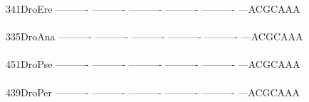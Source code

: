 \documentclass[11pt,twoside,reqno,a4paper]{article}
\begin{document}
{341\hspace*{1\charwidth}DroEre	----------	----------	----------	----------	----------	---ACGCAAA	\\
\hspace*{4\charwidth}\hspace*{7\charwidth}\hspace*{1\charwidth}\hspace*{1\charwidth}\hspace*{1\charwidth}\hspace*{1\charwidth}\hspace*{1\charwidth}\hspace*{1\charwidth}\\
335\hspace*{1\charwidth}DroAna	----------	----------	----------	----------	----------	---ACGCAAA	\\
\hspace*{4\charwidth}\hspace*{7\charwidth}\hspace*{1\charwidth}\hspace*{1\charwidth}\hspace*{1\charwidth}\hspace*{1\charwidth}\hspace*{1\charwidth}\hspace*{1\charwidth}\\
451\hspace*{1\charwidth}DroPse	----------	----------	----------	----------	----------	---ACGCAAA	\\
\hspace*{4\charwidth}\hspace*{7\charwidth}\hspace*{1\charwidth}\hspace*{1\charwidth}\hspace*{1\charwidth}\hspace*{1\charwidth}\hspace*{1\charwidth}\hspace*{1\charwidth}\\
439\hspace*{1\charwidth}DroPer	----------	----------	----------	----------	----------	---ACGCAAA	\\
\hspace*{4\charwidth}\hspace*{7\charwidth}\hspace*{1\charwidth}\hspace*{1\charwidth}\hspace*{1\charwidth}\hspace*{1\charwidth}\hspace*{1\charwidth}\hspace*{1\charwidth}\\
}
\end{document}
